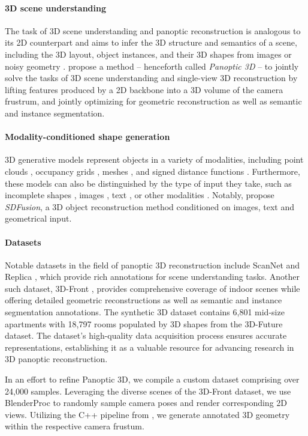 \paragraph{3D scene understanding}
The task of 3D scene understanding and panoptic reconstruction is analogous to its 2D counterpart and aims to infer the 3D structure and semantics of a scene, including the 3D layout, object instances, and their 3D shapes from images \citep{dahnert2021panoptic} or noisy geometry \citep{hou20193d, hou2020revealnet}.
\citet{dahnert2021panoptic} propose a method -- henceforth called \emph{Panoptic 3D} -- to jointly solve the tasks of 3D scene understanding and single-view 3D reconstruction by lifting features produced by a 2D backbone into a 3D volume of the camera frustrum, and jointly optimizing for geometric reconstruction as well as semantic and instance segmentation. 

\vspace*{-5mm}
\paragraph{Modality-conditioned shape generation}
3D generative models represent objects in a variety of modalities, including point clouds \citep{achlioptas2018learning, luo2021diffusion}, occupancy grids \citep{mescheder2019occupancy}, meshes \citep{mo2019structurenet}, and signed distance functions \citep{park2019deepsdf}.
Furthermore, these models can also be distinguished by the type of input they take, such as incomplete shapes \citep{dai2017shape}, images \citep{fan2017point}, text \citep{liu2022towards, zhao2023michelangelo}, or other modalities \citep{Zhou_2021_CVPR}. 
Notably, \citet{cheng2023sdfusion} propose \emph{SDFusion}, a 3D object reconstruction method conditioned on images, text and geometrical input.

\vspace*{-5mm}
\paragraph{Datasets}
Notable datasets in the field of panoptic 3D reconstruction include ScanNet \citep{dai2017scannet} and Replica \citep{straub2019replica}, which provide rich annotations for scene understanding tasks.
Another such dataset, 3D-Front \citep{fu20213d}, provides comprehensive coverage of indoor scenes while offering detailed geometric reconstructions as well as semantic and instance segmentation annotations.
The synthetic 3D dataset contains 6,801 mid-size apartments with 18,797 rooms populated by 3D shapes from the 3D-Future \citep{fu20213e} dataset. The dataset's high-quality data acquisition process ensures accurate representations, establishing it as a valuable resource for advancing research in 3D panoptic reconstruction. 

In an effort to refine Panoptic 3D, we compile a custom dataset comprising over 24,000 samples. Leveraging the diverse scenes of the 3D-Front dataset, we use BlenderProc \citep{Denninger2023} to randomly sample camera poses and render corresponding 2D views. Utilizing the C++ pipeline from \citet{dahnert2021panoptic}, we generate annotated 3D geometry within the respective camera frustum.